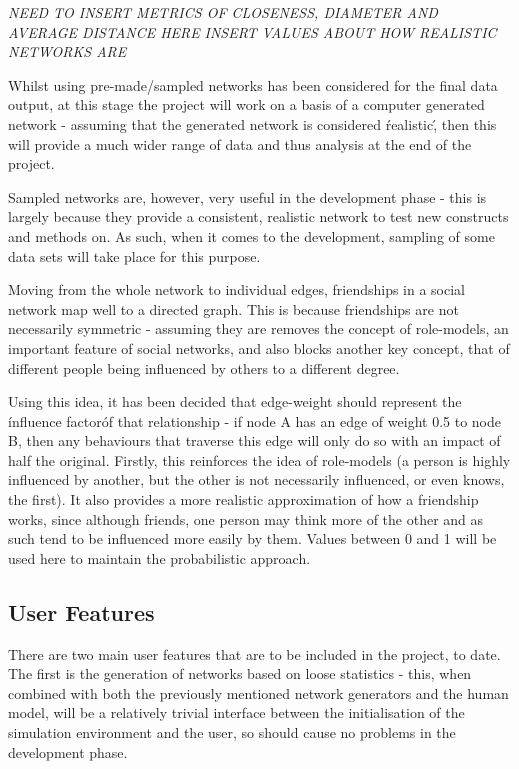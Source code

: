 \documentclass[]{article}
\begin{document}
\emph{NEED TO INSERT METRICS OF CLOSENESS, DIAMETER AND AVERAGE DISTANCE HERE}
\emph{INSERT VALUES ABOUT HOW REALISTIC NETWORKS ARE}

Whilst using pre-made/sampled networks has been considered for the final data output, at this stage the project will work on a basis of a computer generated network - assuming that the generated network is considered \'realistic\', then this will provide a much wider range of data and thus analysis at the end of the project. 

Sampled networks are, however, very useful in the development phase - this is largely because they provide a consistent, realistic network to test new constructs and methods on. As such, when it comes to the development, sampling of some data sets will take place for this purpose. 

Moving from the whole network to individual edges, friendships in a social network map well to a directed graph. This is because friendships are not necessarily symmetric - assuming they are removes the concept of role-models, an important feature of social networks, and also blocks another key concept,  that of different people being influenced by others to a different degree. 

Using this idea, it has been decided that edge-weight should represent the \'influence factor\' of that relationship - if node A has an edge of weight 0.5 to node B, then any behaviours that traverse this edge will only do so with an impact of half the original. Firstly, this reinforces the idea of role-models (a person is highly influenced by another, but the other is not necessarily influenced, or even knows, the first). It also provides a more realistic approximation of how a friendship works, since although friends, one person may think more of the other and as such tend to be influenced more easily by them. Values between 0 and 1 will be used here to maintain the probabilistic approach.

\subsection{User Features}

There are two main user features that are to be included in the project, to date. The first is the generation of networks based on loose statistics - this, when combined with both the previously mentioned network generators and the human model, will be a relatively trivial interface between the initialisation of the simulation environment and the user, so should cause no problems in the development phase. 
\end{document}
